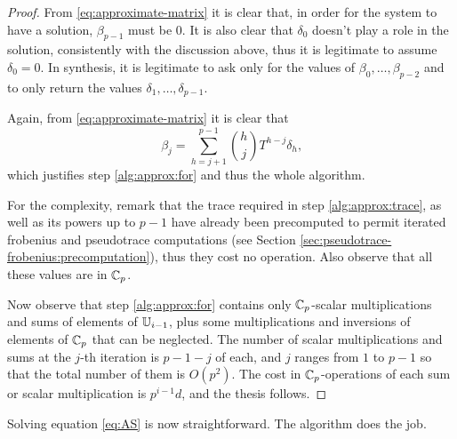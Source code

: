 \begin{proof}
  From \eqref{eq:approximate-matrix} it is clear that, in order for
  the system to have a solution, $\beta_{p-1}$ must be $0$. It is also
  clear that $\delta_0$ doesn't play a role in the solution,
  consistently with the discussion above, thus it is legitimate to
  assume $\delta_0=0$. In synthesis, it is legitimate to ask only for
  the values of $\beta_0,\ldots,\beta_{p-2}$ and to only return the
  values $\delta_1,\ldots,\delta_{p-1}$.

  Again, from \eqref{eq:approximate-matrix} it is clear that
  \[\beta_j = \sum_{h=j+1}^{p-1}\binom{h}{j}T^{h-j}\delta_h\text{,}\]
  which justifies step \ref{alg:approx:for} and thus the whole
  algorithm.

  For the complexity, remark that the trace required in step
  \ref{alg:approx:trace}, as well as its powers up to $p-1$ have
  already been precomputed to permit iterated frobenius and
  pseudotrace computations (see
  Section \ref{sec:pseudotrace-frobenius:precomputation}), thus they
  cost no operation. Also observe that all these values are in $\mathbb{C}_p$.
  
  Now observe that step \ref{alg:approx:for} contains only
  $\mathbb{C}_p$-scalar multiplications and sums of elements of $\mathbb{U}_{i-1}$,
  plus some multiplications and inversions of elements of $\mathbb{C}_p$ that
  can be neglected. The number of scalar multiplications and sums at
  the $j$-th iteration is $p-1-j$ of each, and $j$ ranges from $1$ to
  $p-1$ so that the total number of them is $O(p^2)$. The cost in
  $\mathbb{C}_p$-operations of each sum or scalar multiplication is
  $p^{i-1}d$, and the thesis follows.
\end{proof}

Solving equation \eqref{eq:AS} is now straightforward. The algorithm
 does the job.

